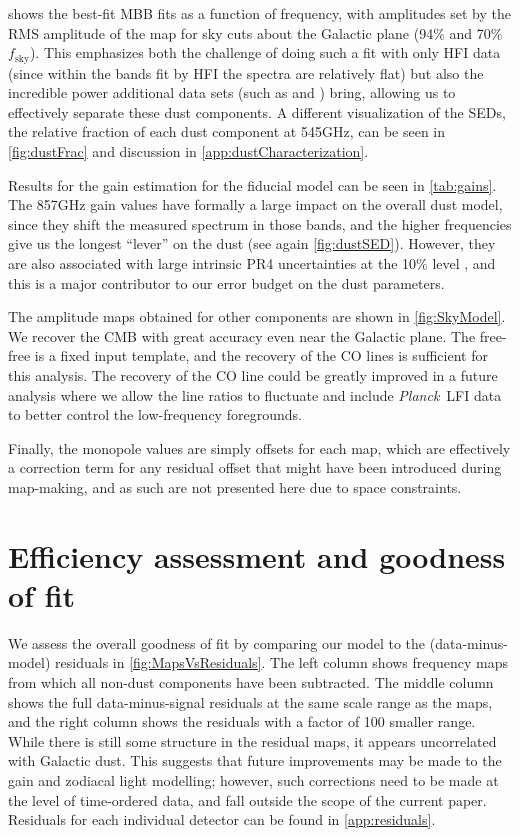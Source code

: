 \documentclass{aa}
\def\Planck{\textit{Planck}}
\def\,{\thinspace}
\begin{document}
 shows the best-fit MBB fits as a function of frequency, with amplitudes set by the RMS amplitude of the map for sky cuts about the Galactic plane (94\% and 70\% $f_\mathrm{sky}$). This emphasizes both the challenge of doing such a fit with only HFI data (since within the bands fit by HFI the spectra are relatively flat) but also the incredible power additional data sets (such as \citealt{edenhofer:2024} and \citealt{wham:2003,2016WHAM}) bring, allowing us to effectively separate these dust components. A different visualization of the SEDs, the relative fraction of each dust component at 545\,GHz, can be seen in \cref{fig:dustFrac} and discussion in \cref{app:dustCharacterization}.

Results for the gain estimation for the fiducial model can be seen in \cref{tab:gains}. The 857\,GHz gain values have formally a large impact on the overall dust model, since they shift the measured spectrum in those bands, and the higher frequencies give us the longest ``lever'' on the dust (see again \cref{fig:dustSED}). However, they are also associated with large intrinsic PR4 uncertainties at the 10\,\% level \citep{planck2020-LVII}, and this is a major contributor to our error budget on the dust parameters. 

The amplitude maps obtained for other components are shown in \cref{fig:SkyModel}. We recover the CMB with great accuracy even near the Galactic plane. The free-free is a fixed input template, and the recovery of the CO lines is sufficient for this analysis. The recovery of the CO line could be greatly improved in a future analysis where we allow the line ratios to fluctuate and  include \Planck\ LFI data to better control the low-frequency foregrounds. 

Finally, the monopole values are simply offsets for each map, which are effectively a correction term for any residual offset that might have been introduced during map-making, and as such are not presented here due to space constraints.


\section{Efficiency assessment and goodness of fit}
\label{sec:gof}
We assess the overall goodness of fit by comparing our model to the (data-minus-model) residuals in \cref{fig:MapsVsResiduals}. The left column shows frequency maps from which all non-dust components have been subtracted. The middle column shows the full data-minus-signal residuals at the same scale range as the maps, and the right column shows the residuals with a factor of 100 smaller range. While there is still some structure in the residual maps, it appears uncorrelated with Galactic dust. This suggests that future improvements may be made to the gain and zodiacal light modelling; however, such corrections need to be made at the level of time-ordered data, and fall outside the scope of the current paper. Residuals for each individual detector can be found in \cref{app:residuals}.
\end{document}
